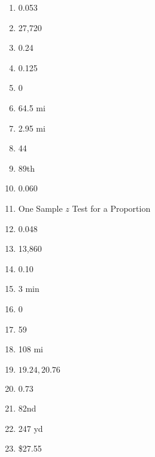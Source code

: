 \documentclass[../uilmath.tex]{subfiles}
\begin{document}
\begin{enumerate}[label=\bfseries\arabic*.]
    \item %
    0.053

    \item %
    27,720

    \item %
    0.24

    \item %
    0.125

    \item %
    0

    \item %
    64.5 mi 

    \item %
    2.95 mi 

    \item %
    44

    \item %
    89th 

    \item %
    0.060

    \item %
    One Sample $z$ Test for a Proportion 

    \item %
    0.048

    \item %
    13,860

    \item %
    0.10

    \item %
    3 min

    \item %
    0

    \item %
    59

    \item %
    108 mi 

    \item %
    ${19.24, 20.76}$

    \item %
    0.73

    \item %
    82nd

    \item %
    247 yd 

    \item %
    \$27.55


\end{enumerate}
\end{document}
